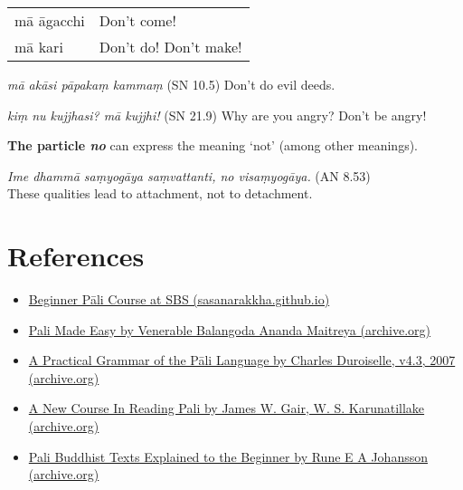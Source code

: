 \documentclass[11pt,oneside]{memoir}
\begin{document}
\begin{center}
\begin{tabular}{ll}
mā āgacchi & Don't come!\\[0pt]
mā kari & Don't do! Don't make!\\[0pt]
\end{tabular}
\end{center}

\emph{mā akāsi pāpakaṃ kammaṃ} (SN 10.5) Don’t do evil deeds.

\emph{kiṃ nu kujjhasi? mā kujjhi!} (SN 21.9) Why are you angry? Don't be angry!

\textbf{The particle \emph{no}} can express the meaning `not' (among other meanings).

\emph{Ime dhammā saṃyogāya saṃvattanti, no visaṃyogāya.} (AN 8.53) \\[0pt]
These qualities lead to attachment, not to detachment.
\chapter{References}
\label{sec:org57acf79}

\begin{itemize}
\item \href{https://sasanarakkha.github.io/study-tools/pali-class.html}{Beginner Pāli Course at SBS (sasanarakkha.github.io)}
\item \href{https://archive.org/details/PaliMadeEasyOCRed}{Pali Made Easy by Venerable Balangoda Ananda Maitreya (archive.org)}
\item \href{https://archive.org/details/PaliGrammarCharlesDuroiselle}{A Practical Grammar of the Pāli Language by Charles Duroiselle, v4.3, 2007 (archive.org)}
\item \href{https://archive.org/details/NewPaliCourse/}{A New Course In Reading Pali by James W. Gair, W. S. Karunatillake (archive.org)}
\item \href{https://archive.org/details/PaliBuddhistTextsA}{Pali Buddhist Texts Explained to the Beginner by Rune E A Johansson (archive.org)}
\end{itemize}
\end{document}
